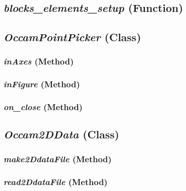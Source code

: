 \subsection{\textit{blocks\_elements\_setup} (Function)}
\label{ssec:.modeling.occamtools.blocks_elements_setup}




\subsection{\textit{OccamPointPicker} (Class)}
\label{ssec:.modeling.occamtools.OccamPointPicker}



\subsubsection{\textit{inAxes} (Method)}
\label{sssec:.modeling.occamtools.OccamPointPicker.inAxes}



\subsubsection{\textit{inFigure} (Method)}
\label{sssec:.modeling.occamtools.OccamPointPicker.inFigure}



\subsubsection{\textit{on\_close} (Method)}
\label{sssec:.modeling.occamtools.OccamPointPicker.on_close}



\subsection{\textit{Occam2DData} (Class)}
\label{ssec:.modeling.occamtools.Occam2DData}




\subsubsection{\textit{make2DdataFile} (Method)}
\label{sssec:.modeling.occamtools.Occam2DData.make2DdataFile}



\subsubsection{\textit{read2DdataFile} (Method)}
\label{sssec:.modeling.occamtools.Occam2DData.read2DdataFile}



